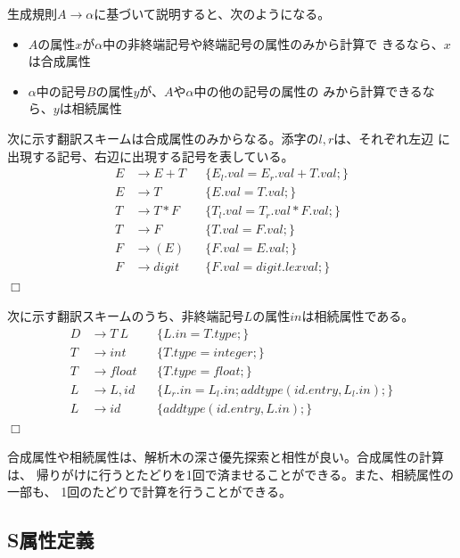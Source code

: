 生成規則$A \rightarrow \alpha$に基づいて説明すると、次のようになる。
\begin{itemize}
 \item $A$の属性$x$が$\alpha$中の非終端記号や終端記号の属性のみから計算で
       きるなら、$x$は合成属性
 \item $\alpha$中の記号$B$の属性$y$が、$A$や$\alpha$中の他の記号の属性の
       みから計算できるなら、$y$は相続属性
\end{itemize}

\begin{example}
 次に示す翻訳スキームは合成属性のみからなる。添字の$l, r$は、それぞれ左辺
 に出現する記号、右辺に出現する記号を表している。
 \begin{align*}
 E & \rightarrow E + T && \{ E_l.val = E_r.val + T.val; \} \\
 E & \rightarrow T && \{E.val = T.val; \} \\
 T & \rightarrow T * F && \{ T_l.val = T_r.val * F.val; \} \\
 T & \rightarrow F && \{ T.val = F.val; \} \\
 F & \rightarrow (E) && \{ F.val = E.val; \} \\
 F & \rightarrow digit && \{ F.val = digit.lexval; \}
 \end{align*}$\Box$
 \label{example:S-attributed definition}
\end{example}

\begin{example}
 次に示す翻訳スキームのうち、非終端記号$L$の属性$in$は相続属性である。
 \begin{align*}
 D & \rightarrow T\ L && \{ L.in = T.type; \} \\
 T & \rightarrow int && \{ T.type = integer; \} \\
 T & \rightarrow float && \{ T.type = float; \} \\
 L & \rightarrow L, id	&& \{ L_r.in = L_l.in; addtype(id.entry, L_l.in); \} \\
 L & \rightarrow id && \{ addtype(id.entry, L.in); \}
 \end{align*}$\Box$
 \label{example:L-attributed definition}
\end{example}

合成属性や相続属性は、解析木の深さ優先探索と相性が良い。合成属性の計算は、
帰りがけに行うとたどりを1回で済ませることができる。また、相続属性の一部も、
1回のたどりで計算を行うことができる。

\subsection{S属性定義}


